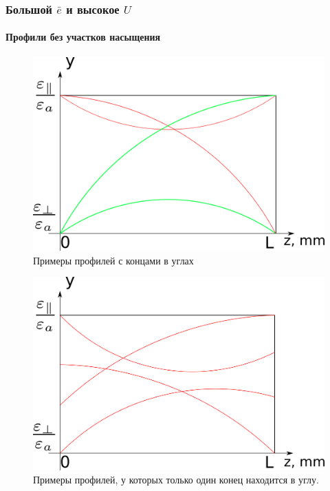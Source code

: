 \documentclass[utf8,secheader]{beamer}
\begin{document}
\begin{frame}
\frametitle{Большой $\bar{e}$ и высокое $U$}
\framesubtitle{Профили без участков насыщения}
\vspace{-0.25cm}
\begin{figure}[ht]
\centering
\begin{minipage}{0.49\textwidth}
\includegraphics[width=\textwidth]{Profiles_corners.png}
\end{minipage}
\hfill
\begin{minipage}{0.49\textwidth}
\caption{Примеры профилей с концами в углах}
\end{minipage}
\end{figure}
\vspace{-0.25cm}
\begin{figure}[ht]
\centering
\begin{minipage}{0.49\textwidth}
\includegraphics[width=\textwidth]{Profiles_corners_and_sides.png}
\end{minipage}
\hfill
\begin{minipage}{0.49\textwidth}
\caption{Примеры профилей, у которых только один конец находится в углу.}
\end{minipage}
\end{figure}
\end{frame}
\end{document}
